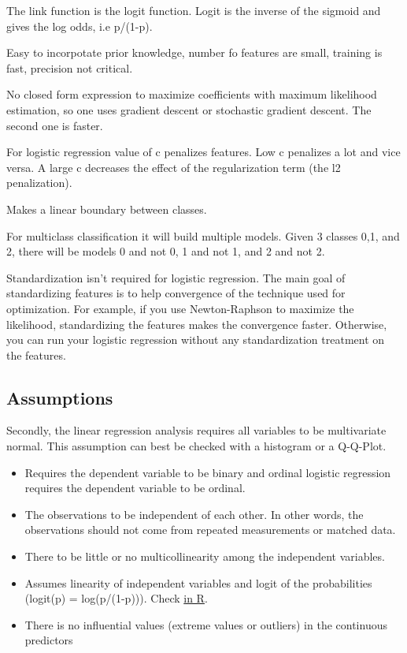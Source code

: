 \documentclass[]{book}
\theoremstyle{definition}
\theoremstyle{definition}
\theoremstyle{definition}
\theoremstyle{remark}
\begin{document}
The link function is the logit function. Logit is the inverse of the
sigmoid and gives the log odds, i.e p/(1-p).

Easy to incorpotate prior knowledge, number fo features are small,
training is fast, precision not critical.

No closed form expression to maximize coefficients with maximum
likelihood estimation, so one uses gradient descent or stochastic
gradient descent. The second one is faster.

For logistic regression value of c penalizes features. Low c penalizes a
lot and vice versa. A large c decreases the effect of the regularization
term (the l2 penalization).

Makes a linear boundary between classes.

For multiclass classification it will build multiple models. Given 3
classes 0,1, and 2, there will be models 0 and not 0, 1 and not 1, and 2
and not 2.

Standardization isn't required for logistic regression. The main goal of
standardizing features is to help convergence of the technique used for
optimization. For example, if you use Newton-Raphson to maximize the
likelihood, standardizing the features makes the convergence faster.
Otherwise, you can run your logistic regression without any
standardization treatment on the features.

\subsection{Assumptions}\label{assumptions-8}

Secondly, the linear regression analysis requires all variables to be
multivariate normal. This assumption can best be checked with a
histogram or a Q-Q-Plot.

\begin{itemize}
\item
  Requires the dependent variable to be binary and ordinal logistic
  regression requires the dependent variable to be ordinal.
\item
  The observations to be independent of each other. In other words, the
  observations should not come from repeated measurements or matched
  data.
\item
  There to be little or no multicollinearity among the independent
  variables.
\item
  Assumes linearity of independent variables and logit of the
  probabilities (logit(p) = log(p/(1-p))). Check
  \href{https://stats.stackexchange.com/questions/169348/how-should-i-check-the-assumption-of-linearity-to-the-logit-for-the-continuous-i}{in
  R}.
\item
  There is no influential values (extreme values or outliers) in the
  continuous predictors
\end{itemize}
\end{document}
